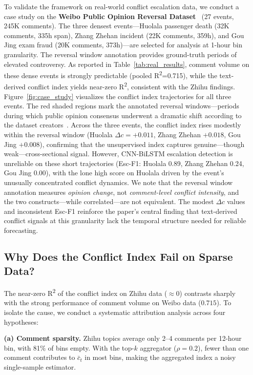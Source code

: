 \documentclass[journal]{IEEEtran}
\begin{document}
To validate the framework on real-world conflict escalation data, we conduct a case study on the \textbf{Weibo Public Opinion Reversal Dataset}~\cite{Zhang2023Reversal} (27 events, 245K comments). The three densest events---Huolala passenger death (32K comments, 335h span), Zhang Zhehan incident (22K comments, 359h), and Gou Jing exam fraud (20K comments, 373h)---are selected for analysis at 1-hour bin granularity. The reversal window annotation provides ground-truth periods of elevated controversy. As reported in Table~\ref{tab:real_results}, comment volume on these dense events is strongly predictable (pooled R\textsuperscript{2}=0.715), while the text-derived conflict index yields near-zero R\textsuperscript{2}, consistent with the Zhihu findings. Figure~\ref{fig:case_study} visualizes the conflict index trajectories for all three events. The red shaded regions mark the annotated reversal windows---periods during which public opinion consensus underwent a dramatic shift according to the dataset creators~\cite{Zhang2023Reversal}. Across the three events, the conflict index rises modestly within the reversal window (Huolala $\Delta c=+0.011$, Zhang Zhehan $+0.018$, Gou Jing $+0.008$), confirming that the unsupervised index captures genuine---though weak---cross-sectional signal. However, CNN-BiLSTM escalation detection is unreliable on these short trajectories (Esc-F1: Huolala 0.89, Zhang Zhehan 0.24, Gou Jing 0.00), with the lone high score on Huolala driven by the event's unusually concentrated conflict dynamics. We note that the reversal window annotation measures \emph{opinion change}, not \emph{comment-level conflict intensity}, and the two constructs---while correlated---are not equivalent. The modest $\Delta c$ values and inconsistent Esc-F1 reinforce the paper's central finding that text-derived conflict signals at this granularity lack the temporal structure needed for reliable forecasting.

\subsection{Why Does the Conflict Index Fail on Sparse Data?}\label{sec:discussion}\label{sec:attribution}

The near-zero R\textsuperscript{2} of the conflict index on Zhihu data ($\approx 0$) contrasts sharply with the strong performance of comment volume on Weibo data ($0.715$). To isolate the cause, we conduct a systematic attribution analysis across four hypotheses:

\textbf{(a) Comment sparsity.} Zhihu topics average only 2--4 comments per 12-hour bin, with 81\% of bins empty. With the top-$k$ aggregator ($\rho{=}0.2$), fewer than one comment contributes to $\bar{c}_t$ in most bins, making the aggregated index a noisy single-sample estimator.
\end{document}
